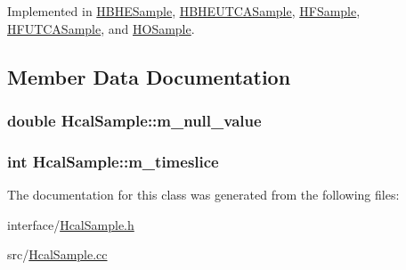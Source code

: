 Implemented in \hyperlink{class_h_b_h_e_sample_ab03c24466f72bce782a3fcf62df15e5f}{H\+B\+H\+E\+Sample}, \hyperlink{class_h_b_h_e_u_t_c_a_sample_a7817d78373bf3a36594ebb581a08fb4c}{H\+B\+H\+E\+U\+T\+C\+A\+Sample}, \hyperlink{class_h_f_sample_aebbfa0a6e0596461bc8585551e12fd38}{H\+F\+Sample}, \hyperlink{class_h_f_u_t_c_a_sample_a0052d9a14ddb41b55e1e5e1983fc9684}{H\+F\+U\+T\+C\+A\+Sample}, and \hyperlink{class_h_o_sample_aed754b102ffe962139bb216df35a308f}{H\+O\+Sample}.



\subsection{Member Data Documentation}
\hypertarget{class_hcal_sample_a112304ae8464aa39317050f94e517384}{}
\subsubsection[{m\+\_\+null\+\_\+value}]{\setlength{\rightskip}{0pt plus 5cm}double Hcal\+Sample\+::m\+\_\+null\+\_\+value\hspace{0.3cm}{\ttfamily [protected]}}\label{class_hcal_sample_a112304ae8464aa39317050f94e517384}
\hypertarget{class_hcal_sample_a2ad2497d17da524bd197b9ca6802388e}{}
\subsubsection[{m\+\_\+timeslice}]{\setlength{\rightskip}{0pt plus 5cm}int Hcal\+Sample\+::m\+\_\+timeslice\hspace{0.3cm}{\ttfamily [protected]}}\label{class_hcal_sample_a2ad2497d17da524bd197b9ca6802388e}


The documentation for this class was generated from the following files\+:\begin{DoxyCompactItemize}
\item 
interface/\hyperlink{_hcal_sample_8h}{Hcal\+Sample.\+h}\item 
src/\hyperlink{_hcal_sample_8cc}{Hcal\+Sample.\+cc}\end{DoxyCompactItemize}

